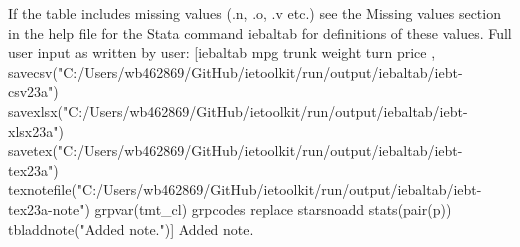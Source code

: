 If the table includes missing values (.n, .o, .v etc.) see the Missing values section in the help file for the Stata command iebaltab for definitions of these values. Full user input as written by user: [iebaltab mpg trunk weight turn price , savecsv("C:/Users/wb462869/GitHub/ietoolkit/run/output/iebaltab/iebt-csv23a") savexlsx("C:/Users/wb462869/GitHub/ietoolkit/run/output/iebaltab/iebt-xlsx23a") savetex("C:/Users/wb462869/GitHub/ietoolkit/run/output/iebaltab/iebt-tex23a") texnotefile("C:/Users/wb462869/GitHub/ietoolkit/run/output/iebaltab/iebt-tex23a-note") grpvar(tmt\_cl) grpcodes replace starsnoadd stats(pair(p)) tbladdnote("Added note.")] Added note.
